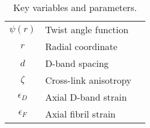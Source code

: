\begin{table}[htb]
\centering
\begin{tabular}{|c l l|} 
\hline
 $\psi(r)$ & Twist angle function & \\ 
 $r$ & Radial coordinate &  \\
 $d$ & D-band spacing & \\
 $\zeta$ & Cross-link anisotropy  &\\
 $\epsilon_D$ & Axial D-band strain & \\
  $\epsilon_F$ & Axial fibril strain & \\
 \hline
\end{tabular}
\caption{Key variables and parameters.}
\label{table:paramtable}
\end{table}








